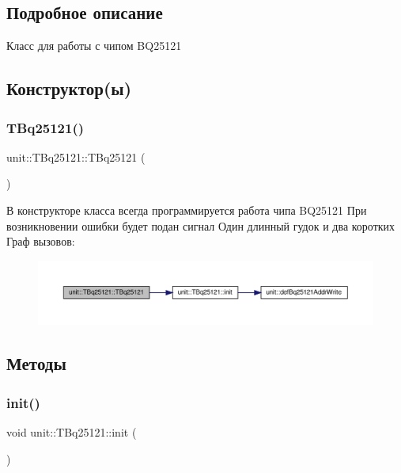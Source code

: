 \subsection{Подробное описание}
Класс для работы с чипом B\+Q25121 

\subsection{Конструктор(ы)}
\mbox{\label{classunit_1_1_t_bq25121_ae620c44c80792004e5ed25182964d419}} 
\subsubsection{\texorpdfstring{T\+Bq25121()}{TBq25121()}}
{\footnotesize\ttfamily unit\+::\+T\+Bq25121\+::\+T\+Bq25121 (\begin{DoxyParamCaption}{ }\end{DoxyParamCaption})}

В конструкторе класса всегда программируется работа чипа B\+Q25121 При возникновении ошибки будет подан сигнал Один длинный гудок и два коротких Граф вызовов\+:\nopagebreak
\begin{figure}[H]
\begin{center}
\leavevmode
\includegraphics[width=350pt]{classunit_1_1_t_bq25121_ae620c44c80792004e5ed25182964d419_cgraph}
\end{center}
\end{figure}


\subsection{Методы}
\mbox{\label{classunit_1_1_t_bq25121_a195490b2493631c50f5f7380436c24be}} 
\subsubsection{\texorpdfstring{init()}{init()}}
{\footnotesize\ttfamily void unit\+::\+T\+Bq25121\+::init (\begin{DoxyParamCaption}{ }\end{DoxyParamCaption})\hspace{0.3cm}{\ttfamily [virtual]}}



